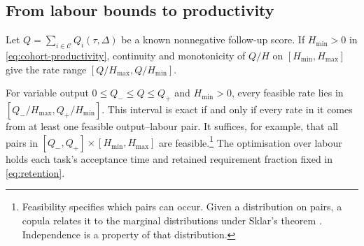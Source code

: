 \subsection{From labour bounds to productivity}

Let $Q=\sum_{i\in\mathcal C}Q_i(\tau,\Delta)$ be a known nonnegative follow-up score. If $H_{\min}>0$ in \eqref{eq:cohort-productivity}, continuity and monotonicity of $Q/H$ on $[H_{\min},H_{\max}]$ give the rate range $[Q/H_{\max},Q/H_{\min}]$.

For variable output $0\leq Q_-\leq Q\leq Q_+$ and $H_{\min}>0$, every feasible rate lies in $[Q_-/H_{\max},Q_+/H_{\min}]$. This interval is exact if and only if every rate in it comes from at least one feasible output--labour pair. It suffices, for example, that all pairs in $[Q_-,Q_+]\times[H_{\min},H_{\max}]$ are feasible.\footnote{Feasibility specifies which pairs can occur. Given a distribution on pairs, a copula relates it to the marginal distributions under Sklar's theorem \cite[Theorem~2]{haugh2016copulas}. Independence is a property of that distribution.} The optimisation over labour holds each task's acceptance time and retained requirement fraction fixed in \eqref{eq:retention}.
